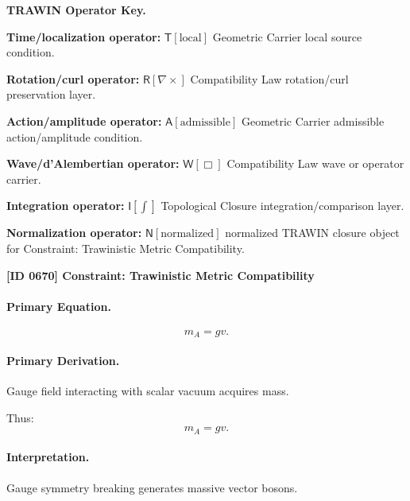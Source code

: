 \par\vspace{0.45\baselineskip}
\noindent\begin{minipage}[t]{\linewidth}
\begingroup
\small
\raggedright
\textbf{TRAWIN Operator Key.}\par
\noindent\textbf{Time/localization operator:} $\mathsf{T}\!\left[\mathrm{local}\right]$ Geometric Carrier local source condition.\par
\noindent\textbf{Rotation/curl operator:} $\mathsf{R}\!\left[\nabla\times\right]$ Compatibility Law rotation/curl preservation layer.\par
\noindent\textbf{Action/amplitude operator:} $\mathsf{A}\!\left[\mathrm{admissible}\right]$ Geometric Carrier admissible action/amplitude condition.\par
\noindent\textbf{Wave/d'Alembertian operator:} $\mathsf{W}\!\left[\Box\right]$ Compatibility Law wave or operator carrier.\par
\noindent\textbf{Integration operator:} $\mathsf{I}\!\left[\int\right]$ Topological Closure integration/comparison layer.\par
\noindent\textbf{Normalization operator:} $\mathsf{N}\!\left[\mathrm{normalized}\right]$ normalized TRAWIN closure object for Constraint: Trawinistic Metric Compatibility.\par
\endgroup
\end{minipage}

\clearpage
\noindent\textbf{[ID 0670] Constraint: Trawinistic Metric Compatibility}\par
\vspace{0.35em}
\paragraph{Primary Equation.}
\begin{equation}
m_A = gv.
\end{equation}

\paragraph{Primary Derivation.}
Gauge field interacting with scalar vacuum acquires mass.

Thus:
\begin{equation}
\boxed{
m_A = gv.
}
\end{equation}

\paragraph{Interpretation.}
Gauge symmetry breaking generates massive vector bosons.


